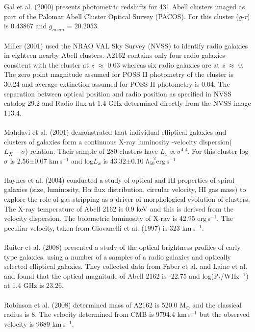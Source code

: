 Gal et al. (2000) presents photometric redshifts for 431 Abell clusters imaged as part of the Palomar Abell Cluster Optical Survey (PACOS). For this cluster (\textit{g-r}) is 0.43867 and $g_{mean}$ = 20.2053.\\\\
Miller (2001) used the NRAO VAL Sky Survey (NVSS) to identify radio galaxies in eighteen nearby Abell clusters. A2162 contains only four radio galaxies consitent with the cluster at \textit{z} $\approx$ 0.03 whereas six radio galaxies are at \textit{z} $\approx$ 0. The zero point magnitude assumed for POSS II photometry of the cluster is 30.24 and average extinction assumed for POSS II photometry is 0.04. The separation between optical position and radio position as specified in NVSS catalog 29.2 and Radio flux at 1.4 GHz determined directly from the NVSS image 113.4.\\\\
Mahdavi et al. (2001) demonstrated that individual elliptical galaxies and clusters of galaxies form a continuous X-ray luminosity -velocity dispersion($L_X-\sigma$) relation. Their sample of 280 clusters have $L_x\propto\sigma^{4.4}$. For this cluster log$\sigma$ is 2.56$\pm$0.07 km\,s$^{-1}$ and log$L_x$ is 43.32$\pm$0.10 $h_{50}^{-2} $erg\,s$^{-1}$\\\\
Haynes et al. (2004) conducted a study of optical and HI properties of spiral galaxies (size, luminosity, H$\alpha$ flux distribution, circular velocity, HI gas mass) to explore the role of gas stripping as a driver of morphological evolution of clusters. The X-ray temperature of Abell 2162 is 0.9 keV and this is derived from the velocity dispersion. The bolometric luminosity of X-ray is 42.95 erg\,s$^{-1}$. The peculiar velocity, taken from Giovanelli et al. (1997) is 323 km\,s$^{-1}$.\\\\
Ruiter et al. (2008) presented a study of the optical brightness profiles of early type galaxies, using a number of a samples of a radio galaxies and optically selected elliptical galaxies. They collected data from Faber et al. and Laine et al. and found that the optical magnitude of Abell 2162 is -22.75 and  log(P$_t$/WHz$^{-1}$) at 1.4 GHz is 23.26.\\\\
Robinson et al. (2008) determined mass of A2162 is 520.0 M$_\odot$ and the classical radius is 8. The velocity determined from CMB is 9794.4 km\,s$^{-1}$ but the observed velocity is 9689 km\,s$^{-1}$.\\\\
